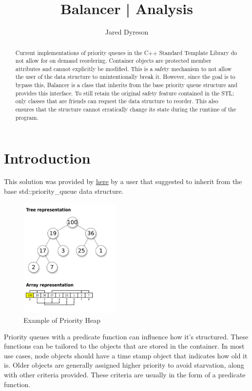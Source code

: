 \documentclass{article}
\title{Balancer | Analysis}
\author{Jared Dyreson}
\begin{document}
\maketitle
\tableofcontents

\newpage

\begin{abstract}
Current implementations of priority queues in the C++ Standard Template Library do not allow for on demand reordering.
Container objects are protected member attributes and cannot explicitly be modified.
This is a safety mechanism to not allow the user of the data structure to unintentionally break it.
However, since the goal is to bypass this, Balancer is a class that inherits from the base priority queue structure and provides this interface.
To still retain the original safety feature contained in the STL; only classes that are friends can request the data structure to reorder.
This also ensures that the structure cannot erratically change its state during the runtime of the program.
\end{abstract}

\section{Introduction}

\begin{flushleft}

This solution was provided by \href{https://stackoverflow.com/questions/5810190/how-to-tell-a-stdpriority-queue-to-refresh-its-ordering}{\underline{here}} by a user that suggested to inherit from the base std::priority_queue data structure.

\begin{figure}[!h]
\centering
\includegraphics[width=5cm]{Max-Heap}
\caption{Example of Priority Heap}
\end{figure}

Priority queues with a predicate function can influence how it's structured.
These functions can be tailored to the objects that are stored in the container.
In most use cases, node objects should have a time stamp object that indicates how old it is.
Older objects are generally assigned higher priority to avoid starvation, along with other criteria provided.
These criteria are usually in the form of a predicate function.
\end{flushleft}
\end{document}
